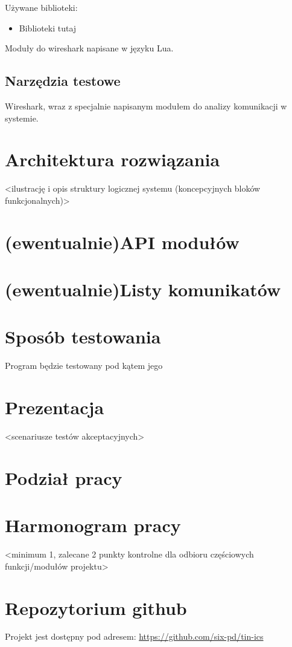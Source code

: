 \documentclass{article}
\begin{document}
Używane biblioteki:
\begin{itemize}

\item Biblioteki tutaj
    
\end{itemize}


Moduły do wireshark napisane w języku Lua.

\subsection{Narzędzia testowe}

Wireshark, wraz z specjalnie napisanym modułem do analizy komunikacji w systemie.

\section{Architektura rozwiązania\label{arch}}

<ilustrację i opis struktury logicznej systemu (koncepcyjnych bloków funkcjonalnych)>

\section{(ewentualnie)API modułów\label{api}}

\section{(ewentualnie)Listy komunikatów\label{kom}}

\section{Sposób testowania\label{test}}

Program będzie testowany pod kątem jego 

\section{Prezentacja\label{prez}}

<scenariusze testów akceptacyjnych>

\section{Podział pracy\label{prac}}

\section{Harmonogram pracy\label{harm}}

<minimum 1, zalecane 2 punkty kontrolne dla odbioru częściowych funkcji/modułów projektu>

\section{Repozytorium github\label{git}}

Projekt jest dostępny pod adresem: \url{https://github.com/six-pd/tin-ics}
\end{document}
